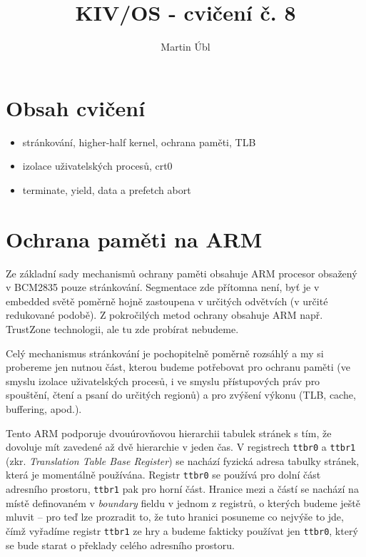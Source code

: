 \documentclass{article}
\author{Martin Úbl}
\title{KIV/OS - cvičení č. 8}
\begin{document}
\maketitle



\section{Obsah cvičení}

\begin{itemize}
	\item stránkování, higher-half kernel, ochrana paměti, TLB
	\item izolace uživatelských procesů, crt0
	\item terminate, yield, data a prefetch abort
\end{itemize}

\section{Ochrana paměti na ARM}

Ze základní sady mechanismů ochrany paměti obsahuje ARM procesor obsažený v BCM2835 pouze stránkování. Segmentace zde přítomna není, byť je v embedded světě poměrně hojně zastoupena v určitých odvětvích (v určité redukované podobě). Z pokročilých metod ochrany obsahuje ARM např. TrustZone technologii, ale tu zde probírat nebudeme.

Celý mechanismus stránkování je pochopitelně poměrně rozsáhlý a my si probereme jen nutnou část, kterou budeme potřebovat pro ochranu paměti (ve smyslu izolace uživatelských procesů, i ve smyslu přístupových práv pro spouštění, čtení a psaní do určitých regionů) a pro zvýšení výkonu (TLB, cache, buffering, apod.).

Tento ARM podporuje dvouúrovňovou hierarchii tabulek stránek s tím, že dovoluje mít zavedené až dvě hierarchie v jeden čas. V registrech \texttt{ttbr0} a \texttt{ttbr1} (zkr. \emph{Translation Table Base Register}) se nachází fyzická adresa tabulky stránek, která je momentálně používána. Registr \texttt{ttbr0} se používá pro dolní část adresního prostoru, \texttt{ttbr1} pak pro horní část. Hranice mezi  a  částí se nachází na místě definovaném v \emph{boundary} fieldu v jednom z registrů, o kterých budeme ještě mluvit -- pro teď lze prozradit to, že tuto hranici posuneme co nejvýše to jde, čímž vyřadíme registr \texttt{ttbr1} ze hry a budeme fakticky používat jen \texttt{ttbr0}, který se bude starat o překlady celého adresního prostoru.
\end{document}
